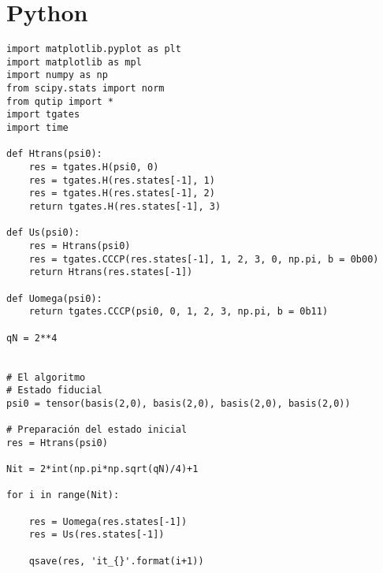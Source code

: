 \section{Python}

\begin{verbatim}
import matplotlib.pyplot as plt
import matplotlib as mpl
import numpy as np
from scipy.stats import norm
from qutip import *
import tgates
import time

def Htrans(psi0):
    res = tgates.H(psi0, 0)
    res = tgates.H(res.states[-1], 1)
    res = tgates.H(res.states[-1], 2)
    return tgates.H(res.states[-1], 3)

def Us(psi0):
    res = Htrans(psi0)
    res = tgates.CCCP(res.states[-1], 1, 2, 3, 0, np.pi, b = 0b00)
    return Htrans(res.states[-1])

def Uomega(psi0):
    return tgates.CCCP(psi0, 0, 1, 2, 3, np.pi, b = 0b11)

qN = 2**4


# El algoritmo
# Estado fiducial
psi0 = tensor(basis(2,0), basis(2,0), basis(2,0), basis(2,0))

# Preparación del estado inicial
res = Htrans(psi0)

Nit = 2*int(np.pi*np.sqrt(qN)/4)+1

for i in range(Nit):
    
    res = Uomega(res.states[-1])
    res = Us(res.states[-1])
    
    qsave(res, 'it_{}'.format(i+1))

\end{verbatim}
